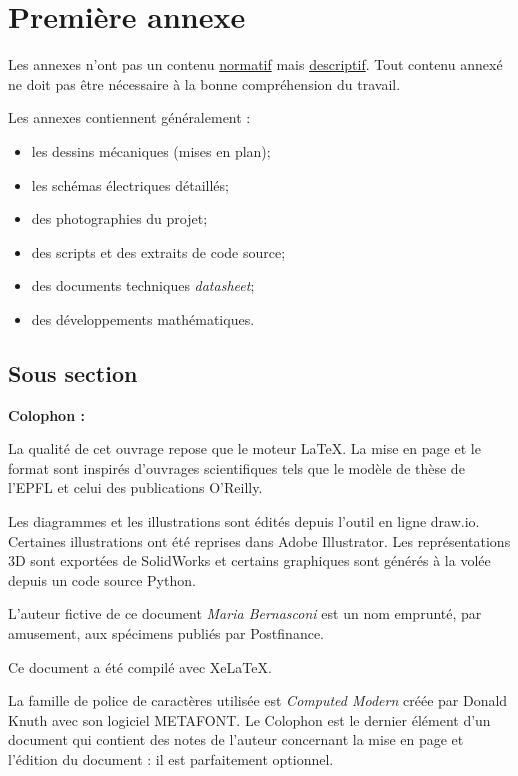 \documentclass[
    iai, %
    eai, %
]{heig-tb}
\begin{document}
\appendix
\appendixpage
\addappheadtotoc

\chapter{Première annexe}

Les annexes n'ont pas un contenu \underline{normatif} mais \underline{descriptif}. Tout contenu annexé ne doit pas être nécessaire à la bonne compréhension du travail.

Les annexes contiennent généralement :

\begin{itemize}
  \item les dessins mécaniques (mises en plan);
  \item les schémas électriques détaillés;
  \item des photographies du projet;
  \item des scripts et des extraits de code source;
  \item des documents techniques \pex \emph{datasheet};
  \item des développements mathématiques.
\end{itemize}
\section{Sous section}
\lipsum[1]

\let\cleardoublepage\clearpage
\backmatter

\label{glossaire}
\printnoidxglossary
\printbibliography
\label{index}
\printindex

\clearpage
\Large\textbf{Colophon :}\par\normalsize
\thispagestyle{empty}
La qualité de cet ouvrage repose que le moteur \LaTeX. La mise en page et le format sont inspirés d'ouvrages scientifiques tels que le modèle de thèse de l'EPFL et celui des publications O'Reilly.

Les diagrammes et les illustrations sont édités depuis l'outil en ligne draw.io. Certaines illustrations ont été reprises dans Adobe Illustrator. Les représentations 3D sont exportées de SolidWorks et certains graphiques sont générés à la volée depuis un code source Python.

L'auteur fictive de ce document \emph{Maria Bernasconi} est un nom emprunté, par amusement, aux spécimens publiés par Postfinance.

Ce document a été compilé avec XeLaTeX.

La famille de police de caractères utilisée est \emph{Computed Modern} créée par Donald Knuth avec son logiciel METAFONT.
\vfil
Le Colophon est le dernier élément d'un document qui contient des notes de l'auteur concernant la mise en page et l'édition du document : il est parfaitement optionnel.
\end{document}
